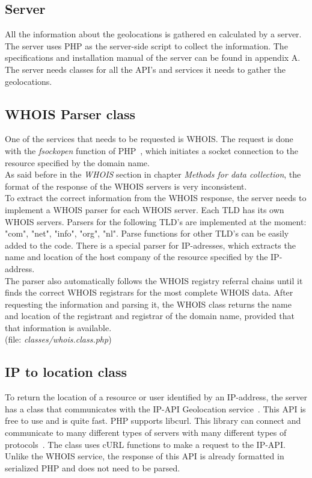 \documentclass[twoside,openright,notitlepage]{uva-bachelor-thesis}
\begin{document}
\subsection{Server}
All the information about the geolocations is gathered en calculated by a server. The server uses PHP as the server-side script to collect the information. The specifications and installation manual of the server can be found in appendix A. The server needs classes for all the API's and services it needs to gather the geolocations.

\subsection{WHOIS Parser class}
One of the services that needs to be requested is WHOIS. The request is done with the \emph{fsockopen} function of PHP~\cite{php1}, which initiates a socket connection to the resource specified by the domain name.\\

As said before in the \emph{WHOIS} section in chapter \emph{Methods for data collection}, the format of the response of the WHOIS servers is very inconsistent.\\

To extract the correct information from the WHOIS response, the server needs to implement a WHOIS parser for each WHOIS server. Each TLD has its own WHOIS servers. Parsers for the following TLD's are implemented at the moment: "com", "net", "info", "org", "nl". Parse functions for other TLD's can be easily added to the code. There is a special parser for IP-adresses, which extracts the name and location of the host company of the resource specified by the IP-address.  \\

The parser also automatically follows the WHOIS registry referral chains until it finds the correct WHOIS registrars for the most complete WHOIS data. After requesting the information and parsing it, the WHOIS class returns the name and location of the registrant and registrar of the domain name, provided that that information is available.\\

(file: \emph{classes/whois.class.php})

\subsection{IP to location class}
To return the location of a resource or user identified by an IP-address, the server has a class that communicates with the IP-API Geolocation service~\cite{ipapi}. This API is free to use and is quite fast. PHP supports libcurl. This library can connect and communicate to many different types of servers with many different types of protocols~\cite{php2}. The class uses cURL functions to make a request to the IP-API. Unlike the WHOIS service, the response of this API is already formatted in serialized PHP and does not need to be parsed. \\
\end{document}
